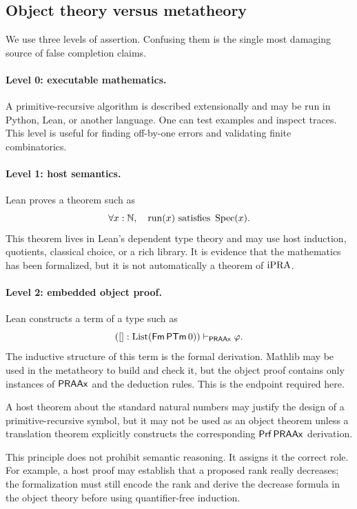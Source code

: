\subsection{Object theory versus metatheory}

We use three levels of assertion.  Confusing them is the single most damaging source
of false completion claims.

\paragraph{Level 0: executable mathematics.}
A primitive-recursive algorithm is described extensionally and may be run in Python,
Lean, or another language.  One can test examples and inspect traces.  This level is
useful for finding off-by-one errors and validating finite combinatorics.

\paragraph{Level 1: host semantics.}
Lean proves a theorem such as
\[
   \forall x:\N,\quad \operatorname{run}(x)\ \text{satisfies}\ \operatorname{Spec}(x).
\]
This theorem lives in Lean's dependent type theory and may use host induction,
quotients, classical choice, or a rich library.  It is evidence that the mathematics
has been formalized, but it is not automatically a theorem of \(\mathrm{iPRA}\).

\paragraph{Level 2: embedded object proof.}
Lean constructs a term of a type such as
\[
   ([] : \mathrm{List}(\mathsf{Fm}\,\mathsf{PTm}\,0))\vdash_{\mathsf{PRAAx}}\varphi.
\]
The inductive structure of this term is the formal derivation.  Mathlib may be used in
the metatheory to build and check it, but the object proof contains only instances of
\(\mathsf{PRAAx}\) and the deduction rules.  This is the endpoint required here.

\begin{principle}
A host theorem about the standard natural numbers may justify the design of a
primitive-recursive symbol, but it may not be used as an object theorem unless a
translation theorem explicitly constructs the corresponding \(\mathsf{Prf}\,\mathsf{PRAAx}\)
derivation.
\end{principle}

This principle does not prohibit semantic reasoning.  It assigns it the correct role.
For example, a host proof may establish that a proposed rank really decreases; the
formalization must still encode the rank and derive the decrease formula in the object
theory before using quantifier-free induction.

